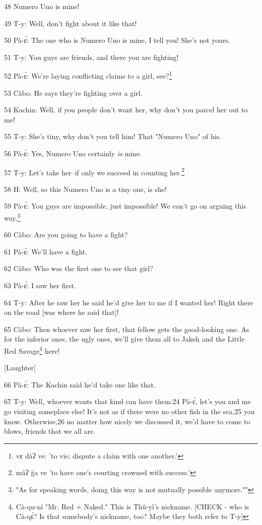 48             Numero Uno is mine!

49 T-y: Well, don't fight about it like that!

50 Pà-ɛ́: The one who is Numero Uno is mine, I tell you! She's not yours.

51 T-y: You guys are friends, and there you are fighting!

52 Pà-ɛ́: We're laying conflicting claims to a girl, see?\footnote{vɛ dàʔ ve: 'to vie; dispute a claim with one another.'}

53 Càbo: He says they're fighting over a girl.

54 Kachin: Well, if you people don't want her, why don't you parcel her out to
me!

55 T-y: She's tiny, why don't you tell him! That "Numero Uno"
of his.

56 Pà-ɛ́: Yes, Numero Uno certainly\textit{ is} mine.

57 T-y: Let's take her--if only we succeed in counting her.\footnote{mâʔ g̈a ve 'to have one's courting crowned with success.'}

58 H: Well, so this Numero Uno is a tiny one, is she!

59 Pà-ɛ́: You guys are impossible, just impossible! We can't go on arguing this
way.\footnote{"As for speaking words, doing this way is not mutually possible anymore.""}

60 Càbo: Are you going to have a fight?

61 Pà-ɛ́: We'll have a fight.

62 Càbo: Who was the first one to see that girl?

63 Pà-ɛ́: I saw her first.

64 T-y: After he saw her he said he'd give her to me if I wanted her! Right there
on the road [was where he said that]!

65 Càbo: Then whoever saw her first, that fellow gets the good-looking one. As
for the inferior ones, the ugly ones, we'll give them all to Jakeh and the Little
Red Savage\footnote{Cà-qu-ní "Mr. Red + Naked." This is Thû-yì's nickname. [CHECK - who is Cà-qɛ́? Is that somebody's nickname, too? Maybe they both refer to T-y]} here!

\begin{center}
[Laughter]
\end{center}

\leftskip=0pt
66 Pà-ɛ́: The Kachin said he'd take one like that.

67 T-y: Well, whoever wants that kind can have them.{\small{}24} Pà-ɛ́, let's
you and me go visiting someplace else! It's not as if there were no other fish
in the sea,{\small{}25} you know. Otherwise,{\small{}26} no matter how nicely we
discussed it, we'd have to come to blows, friends that we all are.

